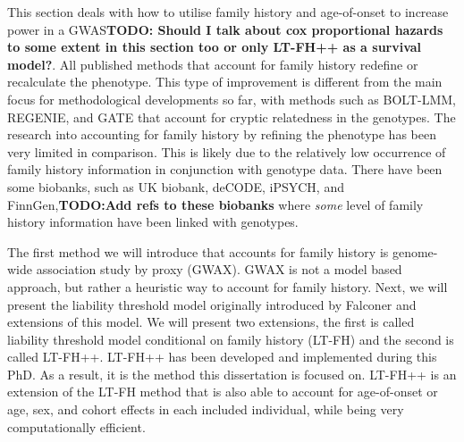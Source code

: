 
This section deals with how to utilise family history and age-of-onset to increase power in a GWAS\textbf{TODO: Should I talk about cox proportional hazards to some extent in this section too or only LT-FH++ as a survival model?}. All published methods that account for family history redefine or recalculate the phenotype. This type of improvement is different from the main focus for methodological developments so far, with methods such as BOLT-LMM\cite{loh2015efficient}, REGENIE\cite{mbatchou2021computationally}, and GATE\cite{dey2022efficient} that account for cryptic relatedness in the genotypes. The research into accounting for family history by refining the phenotype has been very limited in comparison. This is likely due to the relatively low occurrence of family history information in conjunction with genotype data. There have been some biobanks, such as UK biobank, deCODE, iPSYCH, and FinnGen,\textbf{TODO:Add refs to these biobanks} where \textit{some} level of family history information have been linked with genotypes. 

The first method we will introduce that accounts for family history is genome-wide association study by proxy (GWAX)\cite{gwax}. GWAX is not a model based approach, but rather a heuristic way to account for family history. Next, we will present the liability threshold model originally introduced by Falconer\cite{falconer1965inheritance} and extensions of this model. We will present two extensions, the first is called liability threshold model conditional on family history (LT-FH)\cite{hujoel2020liability} and the second is called LT-FH++. LT-FH++ has been developed and implemented during this PhD. As a result, it is the method this dissertation is focused on. LT-FH++ is an extension of the LT-FH method that is also able to account for age-of-onset or age, sex, and cohort effects in each included individual, while being very computationally efficient. 

